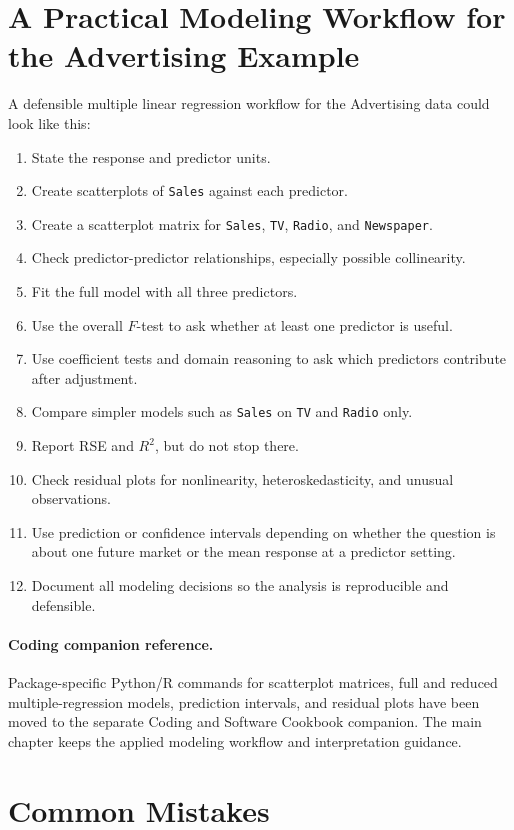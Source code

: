 \section{A Practical Modeling Workflow for the Advertising Example}

A defensible multiple linear regression workflow for the Advertising data could look like this:
\begin{enumerate}
  \item State the response and predictor units.
  \item Create scatterplots of \texttt{Sales} against each predictor.
  \item Create a scatterplot matrix for \texttt{Sales}, \texttt{TV}, \texttt{Radio}, and \texttt{Newspaper}.
  \item Check predictor-predictor relationships, especially possible collinearity.
  \item Fit the full model with all three predictors.
  \item Use the overall \(F\)-test to ask whether at least one predictor is useful.
  \item Use coefficient tests and domain reasoning to ask which predictors contribute after adjustment.
  \item Compare simpler models such as \texttt{Sales} on \texttt{TV} and \texttt{Radio} only.
  \item Report RSE and \(R^2\), but do not stop there.
  \item Check residual plots for nonlinearity, heteroskedasticity, and unusual observations.
  \item Use prediction or confidence intervals depending on whether the question is about one future market or the mean response at a predictor setting.
  \item Document all modeling decisions so the analysis is reproducible and defensible.
\end{enumerate}


\paragraph{Coding companion reference.}
Package-specific Python/R commands for scatterplot matrices, full and reduced multiple-regression models, prediction intervals, and residual plots have been moved to the separate Coding and Software Cookbook companion.  The main chapter keeps the applied modeling workflow and interpretation guidance.

\section{Common Mistakes}

